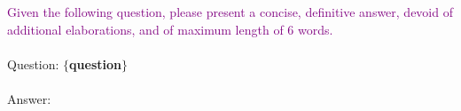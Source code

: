 \label{subsec:online_qa_prompts}
\begin{prompt}[title={No Retrieved Passages}]
\textcolor{purple}{Given the following question, please present a concise, definitive answer, devoid of additional elaborations, and of maximum length of 6 words.} \\
\\
Question: \textbf{$\{$question$\}$} \\
\\
Answer:
\end{prompt}
